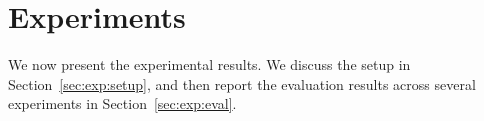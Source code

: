 \section{Experiments}
\label{sec:experiments}

We now present the experimental results. We discuss the setup in Section~\ref{sec:exp:setup}, and then report the evaluation results across several experiments in Section~\ref{sec:exp:eval}.

\newcommand{\fst}[1]{\textbf{\textcolor{sota}{#1}}}
\newcommand{\snd}[1]{\textbf{\textcolor{second}{#1}}}



